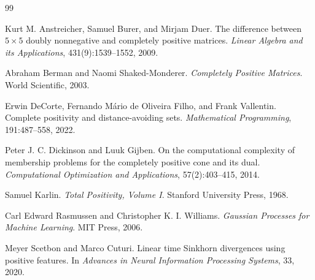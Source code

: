 \documentclass[11pt]{article}
\theoremstyle{definition}
\theoremstyle{plain}
\theoremstyle{remark}
\begin{document}

\begin{thebibliography}{99}

Kurt M. Anstreicher, Samuel Burer, and Mirjam Duer.
\newblock The difference between $5\times5$ doubly nonnegative and completely positive matrices.
\newblock \emph{Linear Algebra and its Applications}, 431(9):1539--1552, 2009.

Abraham Berman and Naomi Shaked-Monderer.
\newblock \emph{Completely Positive Matrices}.
\newblock World Scientific, 2003.

Erwin DeCorte, Fernando M\'ario de Oliveira Filho, and Frank Vallentin.
\newblock Complete positivity and distance-avoiding sets.
\newblock \emph{Mathematical Programming}, 191:487--558, 2022.

Peter J. C. Dickinson and Luuk Gijben.
\newblock On the computational complexity of membership problems for the completely positive cone and its dual.
\newblock \emph{Computational Optimization and Applications}, 57(2):403--415, 2014.

Samuel Karlin.
\newblock \emph{Total Positivity, Volume I}.
\newblock Stanford University Press, 1968.

Carl Edward Rasmussen and Christopher K. I. Williams.
\newblock \emph{Gaussian Processes for Machine Learning}.
\newblock MIT Press, 2006.

Meyer Scetbon and Marco Cuturi.
\newblock Linear time Sinkhorn divergences using positive features.
\newblock In \emph{Advances in Neural Information Processing Systems}, 33, 2020.

\end{thebibliography}
\end{document}
